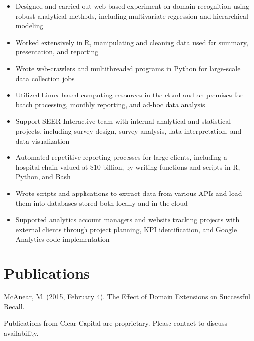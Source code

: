 \documentclass[11pt,a4paper,]{awesome-cv}
\providecommand{\tightlist}{%
	\setlength{\itemsep}{0pt}\setlength{\parskip}{0pt}}
\begin{document}
\begin{itemize}
\tightlist
\item
  Designed and carried out web-based experiment on domain recognition
  using robust analytical methods, including multivariate regression and
  hierarchical modeling
\item
  Worked extensively in R, manipulating and cleaning data used for
  summary, presentation, and reporting
\item
  Wrote web-crawlers and multithreaded programs in Python for
  large-scale data collection jobs
\item
  Utilized Linux-based computing resources in the cloud and on premises
  for batch processing, monthly reporting, and ad-hoc data analysis
\item
  Support SEER Interactive team with internal analytical and statistical
  projects, including survey design, survey analysis, data
  interpretation, and data visualization
\item
  Automated repetitive reporting processes for large clients, including
  a hospital chain valued at \$10 billion, by writing functions and
  scripts in R, Python, and Bash
\item
  Wrote scripts and applications to extract data from various APIs and
  load them into databases stored both locally and in the cloud
\item
  Supported analytics account managers and website tracking projects
  with external clients through project planning, KPI identification,
  and Google Analytics code implementation
\end{itemize}

\hypertarget{publications}{%
\section{Publications}\label{publications}}

McAnear, M. (2015, February 4).
\href{https://www.linkedin.com/in/mcanearm/detail/treasury/position:542128688/?entityUrn=urn\%3Ali\%3Afsd_profileTreasuryMedia\%3A(ACoAAAnxGAcBvRV_hP_B01HidwhCRvx1_JiTN5k\%2C51020715)\&parentEntityUrn=urn\%3Ali\%3Afsd_profilePosition\%3A(ACoAAAnxGAcBvRV_hP_B01HidwhCRvx1_JiTN5k\%2C542128688)\&section=position\%3A542128688\&treasuryCount=1\&lipi=urn\%3Ali\%3Apage\%3Ad_flagship3_profile_view_base\%3B2Qy9E70TQSWz7FckC276aA\%3D\%3D\&licu=urn\%3Ali\%3Acontrol\%3Ad_flagship3_profile_view_base-treasury_thumbnail_cell}{The
Effect of Domain Extensions on Successful Recall.}

Publications from Clear Capital are proprietary. Please contact to
discuss availability.
\end{document}
